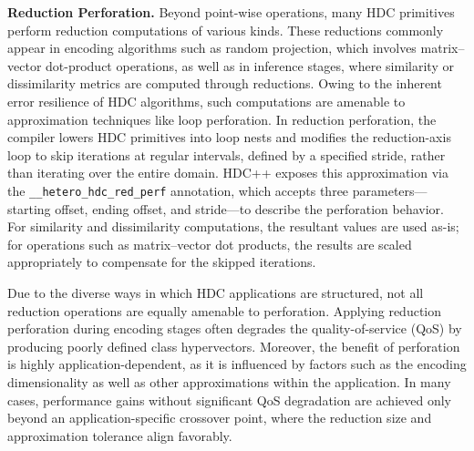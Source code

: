 \textbf{Reduction Perforation.} Beyond point-wise operations, many HDC primitives perform reduction computations of various kinds. These reductions commonly appear in encoding algorithms such as random projection, which involves matrix–vector dot-product operations, as well as in inference stages, where similarity or dissimilarity metrics are computed through reductions. Owing to the inherent error resilience of HDC algorithms, such computations are amenable to approximation techniques like loop perforation. In reduction perforation, the compiler lowers HDC primitives into loop nests and modifies the reduction-axis loop to skip iterations at regular intervals, defined by a specified stride, rather than iterating over the entire domain. HDC++ exposes this approximation via the \textcolor{blue!41!black}{\texttt{\_\_hetero\_hdc\_red\_perf}} annotation, which accepts three parameters—starting offset, ending offset, and stride—to describe the perforation behavior. For similarity and dissimilarity computations, the resultant values are used as-is; for operations such as matrix–vector dot products, the results are scaled appropriately to compensate for the skipped iterations. 

Due to the diverse ways in which HDC applications are structured, not all reduction operations are equally amenable to perforation. Applying reduction perforation during encoding stages often degrades the quality-of-service (QoS) by producing poorly defined class hypervectors. Moreover, the benefit of perforation is highly application-dependent, as it is influenced by factors such as the encoding dimensionality as well as other approximations within the application. In many cases, performance gains without significant QoS degradation are achieved only beyond an application-specific crossover point, where the reduction size and approximation tolerance align favorably. 

